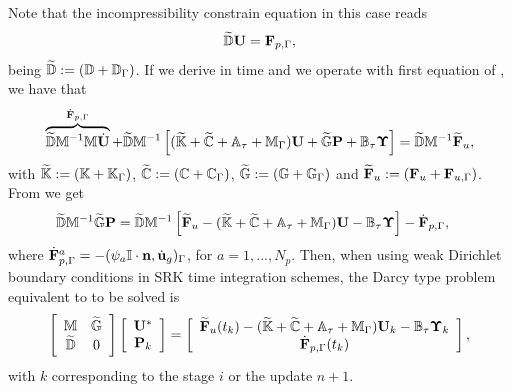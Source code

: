 Note that the incompressibility constrain equation in this case reads
\begin{equation}
\label{eq-C7_inc_constraint_eq_weak}
\widetilde{\mathbb{D}}{\bf U}={\bf F}_{p,\Gamma},
\end{equation}
being $ \widetilde{\mathbb{D}}:=(\mathbb{D}+\mathbb{D}_\Gamma) $. If we derive  in time and we operate with first equation of , we have that
\begin{align}
\label{eq-C7_SRK_weak_u}
\overbrace{\widetilde{\mathbb{D}}\mathbb{M}^{-1}\mathbb{M}\dot{{\bf U}}}^{\dot{{\bf F}}_{p,\Gamma}}
+\widetilde{\mathbb{D}}\mathbb{M}^{-1}\left[(\widetilde{\mathbb{K}}+\widetilde{\mathbb{C}}+\mathbb{A}_\tau+\mathbb{M}_\Gamma){\bf U}+\widetilde{\mathbb{G}}{\bf P}+\mathbb{B}_\tau\boldsymbol{\Upsilon}\right] = \widetilde{\mathbb{D}}\mathbb{M}^{-1}\widetilde{{\bf F}}_u,
\end{align}
with $ \widetilde{\mathbb{K}}:=(\mathbb{K}+\mathbb{K}_\Gamma) $, $ \widetilde{\mathbb{C}}:=(\mathbb{C}+\mathbb{C}_\Gamma) $, $ \widetilde{\mathbb{G}}:=(\mathbb{G}+\mathbb{G}_\Gamma) $ and $ \widetilde{{\bf F}}_u:=({\bf F}_u+{\bf F}_{u,\Gamma}) $. From  we get
\begin{align}
\label{eq-C7_SRK_weak_dm1p}
&\widetilde{\mathbb{D}}\mathbb{M}^{-1}\widetilde{\mathbb{G}}{\bf P} = \widetilde{\mathbb{D}}\mathbb{M}^{-1}\left[\widetilde{{\bf F}}_u-(\widetilde{\mathbb{K}}+\widetilde{\mathbb{C}}+\mathbb{A}_\tau+\mathbb{M}_\Gamma){\bf U}-\mathbb{B}_\tau\boldsymbol{\Upsilon}\right] - \dot{{\bf F}}_{p,\Gamma},
\end{align}
where $\dot{{\bf F}}_{p,\Gamma}^a=-(\psi_{a}\mathbb{I}\cdot{\bf n},\dot{{\bf u}}_g)_\Gamma$, for $a=1,...,N_p$. Then, when using weak Dirichlet boundary conditions in SRK time integration schemes, the Darcy type problem equivalent to  to be solved is
\begin{equation}
\label{eq-C7_SRK_upeta_RK_p_darcy_weak}
\left[\begin{array}{cc}
\mathbb{M}&\widetilde{\mathbb{G}}\\
\widetilde{\mathbb{D}}&0
\end{array}\right]\left[\begin{array}{c}
{\bf U}^*\\
{\bf P}_k
\end{array}\right]=\left[\begin{array}{c}
\widetilde{{\bf F}}_u(t_k)-(\widetilde{\mathbb{K}}+\widetilde{\mathbb{C}}+\mathbb{A}_\tau+\mathbb{M}_\Gamma){\bf U}_k-\mathbb{B}_\tau\boldsymbol{\Upsilon}_k\\
\dot{{\bf F}}_{p,\Gamma}(t_k)
\end{array}\right],
\end{equation}
with $k$ corresponding to the stage $i$ or the update $n+1$.

